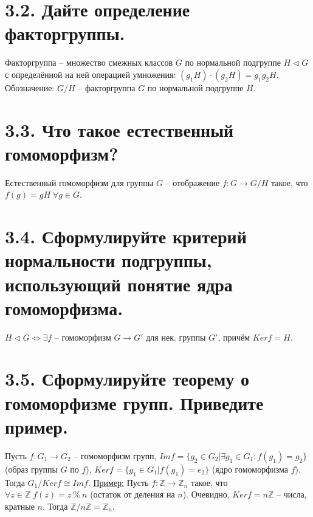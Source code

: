 \documentclass{article}
\begin{document}
\section*{\LARGE 3.2. Дайте определение факторгруппы.}
Факторгруппа -- множество смежных классов $G$ по нормальной подгруппе $H\triangleleft G$ с определённой на ней операцией умножения: $(g_1H)\cdot(g_2H) = g_1g_2H$. \newline Обозначение: $G/H$ -- факторгруппа $G$ по нормальной подгруппе $H$.

\section*{\LARGE 3.3. Что такое естественный гомоморфизм?}
Естественный гомоморфизм для группы $G$ -- отображение $f : G \rightarrow G/H$ такое, что $f(g) = gH \; \forall g \in G$.

\section*{\LARGE 3.4. Сформулируйте критерий нормальности подгруппы, использующий понятие ядра гомоморфизма.}
$H\triangleleft G \Leftrightarrow \exists f \mbox{ -- гомоморфизм } G \rightarrow G' \mbox{ для нек. группы } G',\, \mbox{причём } Kerf = H$. 

\section*{\LARGE 3.5. Сформулируйте теорему о гомоморфизме групп. Приведите пример.}
Пусть $f : G_1 \rightarrow G_2$ -- гомоморфизм групп,
\newline $Imf = \{g_2 \in G_2 | \exists g_1 \in G_1 : f(g_1) = g_2\}$ (образ группы $G$ по $f$), 
\newline $Kerf = \{g_1 \in G_1 | f(g_1) = e_2\}$ (ядро гомоморфизма $f$).
\newline Тогда $G_1/Kerf \cong Imf$.
\newline \underline{Пример:}
\newline Пусть $f : \mathbb{Z} \rightarrow \mathbb{Z}_n$ такое, что $\forall z \in \mathbb{Z} \; f(z) = z \:\%\: n$ (остаток от деления на $n$). Очевидно, $Kerf = n\mathbb{Z}$ -- числа, кратные $n$. Тогда $\mathbb{Z}/n\mathbb{Z} = \mathbb{Z}_n$.
\end{document}
